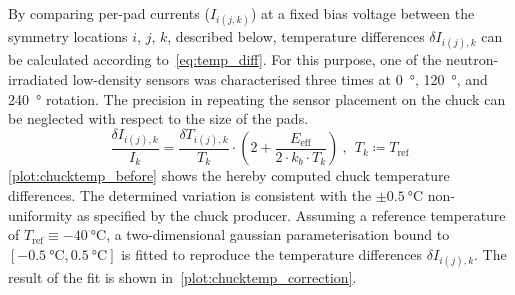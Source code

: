 By comparing per-pad currents ($I_{i(j,k)}$) at a fixed bias voltage between the symmetry locations $i$, $j$, $k$, described below, temperature differences $\delta I_{i(j), k}$ can be calculated according to~\ref{eq:temp_diff}.
For this purpose, one of the neutron-irradiated low-density sensors was characterised three times at \SI{0}{\degree}, \SI{120}{\degree}, and \SI{240}{\degree} rotation.
The precision in repeating the sensor placement on the chuck can be neglected with respect to the size of the pads. 
\begin{equation}
    \frac{\delta I_{i(j),k}}{I_k} = \frac{\delta T_{i(j), k}}{T_k} \cdot \left(2 + \frac{E_\text{eff}}{2\cdot k_b \cdot T_k} \right)~,~~T_k \coloneqq T_\text{ref}
    \label{eq:temp_diff}
\end{equation}
\ref{plot:chucktemp_before} shows the hereby computed chuck temperature differences.
The determined variation is consistent with the $\pm\SI{0.5}{\celsius}$ non-uniformity as specified by the chuck producer.
Assuming a reference temperature of $T_\text{ref}\equiv\SI{-40}{\celsius}$, a two-dimensional gaussian parameterisation bound to $[\SI{-0.5}{\celsius}, \SI{0.5}{\celsius}]$ is fitted to reproduce the temperature differences $\delta I_{i(j),k}$.
The result of the fit is shown in~\ref{plot:chucktemp_correction}.
